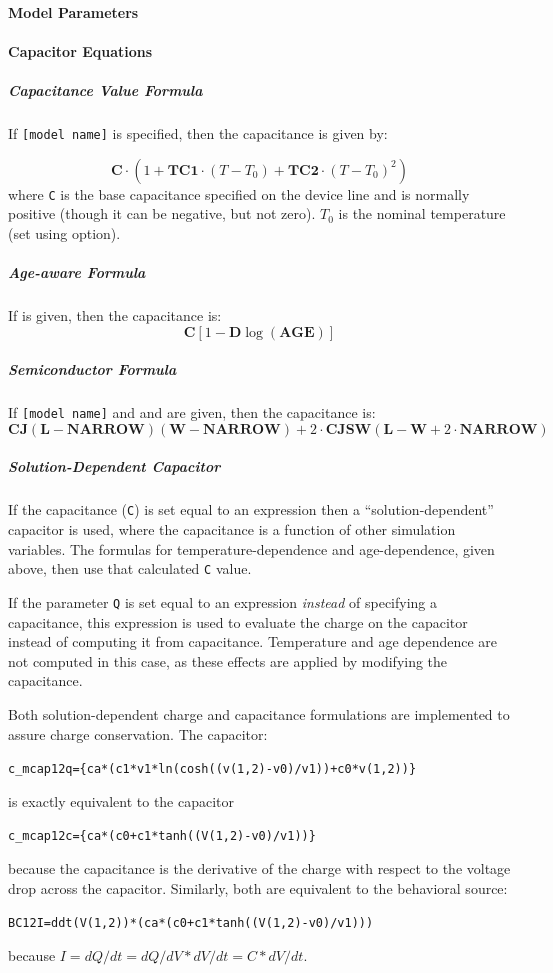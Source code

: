 \paragraph{Model Parameters}



\paragraph{Capacitor Equations}

\subparagraph{Capacitance Value Formula}
If \texttt{[model name]} is specified, then the capacitance is given by:

\[
 \mathbf{C} \cdot (1 + \mathbf{TC1} \cdot (T - T_0) +
\mathbf{TC2} \cdot (T - T_0)^2)
\]
where \texttt{C} is the base capacitance specified on the device line
and is normally positive (though it can be negative, but not zero).
$T_0$ is the nominal temperature (set using  option).

\subparagraph{Age-aware Formula}
If  is given, then the capacitance is:
\[\mathbf{C}[1 - \mathbf{D} \log(\mathbf{AGE})]\]

\subparagraph{Semiconductor Formula}
If \texttt{[model name]} and  and  are given, then the capacitance is:
\[
\mathbf{CJ}(\mathbf{L} - \mathbf{NARROW})(\mathbf{W} - \mathbf{NARROW}) + 2
\cdot \mathbf{CJSW}(\mathbf{L} - \mathbf{W} + 2 \cdot \mathbf{NARROW})
\]

\subparagraph{Solution-Dependent Capacitor}
If the capacitance (\texttt{C}) is set equal to an expression then a
``solution-dependent'' capacitor is used, where the capacitance is
a function of other simulation variables.  The formulas for
temperature-dependence and age-dependence, given above, then use that
calculated \texttt{C} value.

If the parameter \texttt{Q} is set equal to an expression {\em
  instead} of specifying a capacitance, this expression is used to
evaluate the charge on the capacitor instead of computing it from
capacitance.  Temperature and age dependence are not computed in this
case, as these effects are applied by modifying the capacitance.

Both solution-dependent charge and capacitance formulations are
implemented to assure charge conservation.  The capacitor:
\begin{alltt}
  c\_mcap 1 2 q=\{ca*(c1*v1*ln(cosh((v(1,2)-v0)/v1))+c0*v(1,2))\}
\end{alltt}
is exactly equivalent to the capacitor
\begin{alltt}
  c\_mcap 1 2 c=\{ca*(c0+c1*tanh((V(1,2)-v0)/v1))\}
\end{alltt}
because the capacitance is the derivative of the charge with respect
to the voltage drop across the capacitor.  Similarly, both are
equivalent to the behavioral source:
\begin{alltt}
  BC 1 2 I={ddt(V(1,2))*(ca*(c0+c1*tanh((V(1,2)-v0)/v1)))}
\end{alltt}
because $I=dQ/dt=dQ/dV*dV/dt=C*dV/dt$.

